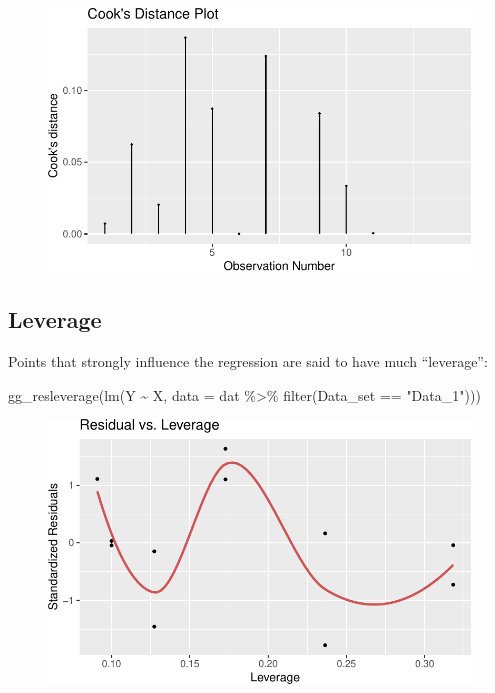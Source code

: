 \documentclass[
  letterpaper,
  DIV=11,
  numbers=noendperiod]{scrreprt}
\newenvironment{Shaded}{\begin{snugshade}}{\end{snugshade}}
\newcommand{\AttributeTok}[1]{\textcolor[rgb]{0.40,0.45,0.13}{#1}}
\newcommand{\FunctionTok}[1]{\textcolor[rgb]{0.28,0.35,0.67}{#1}}
\newcommand{\NormalTok}[1]{\textcolor[rgb]{0.00,0.23,0.31}{#1}}
\newcommand{\SpecialCharTok}[1]{\textcolor[rgb]{0.37,0.37,0.37}{#1}}
\newcommand{\StringTok}[1]{\textcolor[rgb]{0.13,0.47,0.30}{#1}}
\begin{document}
\begin{figure}[H]

{\centering \includegraphics{./08-linearreg_files/figure-pdf/unnamed-chunk-28-4.pdf}

}

\end{figure}

\hypertarget{leverage}{%
\subsection{Leverage}\label{leverage}}

Points that strongly influence the regression are said to have much
``leverage'':

\begin{Shaded}
\begin{Highlighting}[]
\FunctionTok{gg\_resleverage}\NormalTok{(}\FunctionTok{lm}\NormalTok{(Y }\SpecialCharTok{\textasciitilde{}}\NormalTok{ X, }\AttributeTok{data =}\NormalTok{ dat }\SpecialCharTok{\%\textgreater{}\%} \FunctionTok{filter}\NormalTok{(Data\_set }\SpecialCharTok{==} \StringTok{"Data\_1"}\NormalTok{)))}
\end{Highlighting}
\end{Shaded}

\begin{figure}[H]

{\centering \includegraphics{./08-linearreg_files/figure-pdf/unnamed-chunk-29-1.pdf}

}

\end{figure}
\end{document}
